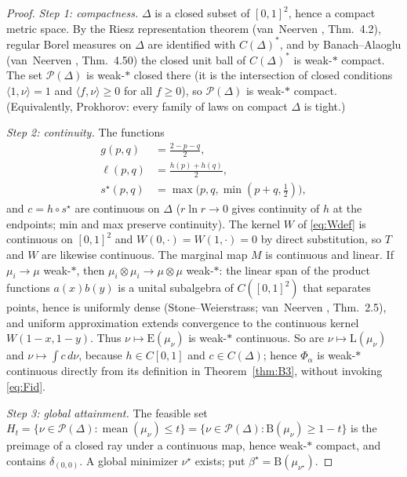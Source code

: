 \documentclass[11pt]{article}
\theoremstyle{plain}
\theoremstyle{definition}
\theoremstyle{remark}
\DeclareMathOperator{\mean}{mean}
\newcommand{\PP}{\mathcal P}
\newcommand{\DD}{\Delta}
\newcommand{\sstar}{s^{\star}}
\newcommand{\Lb}{\mathrm{L}}
\newcommand{\Bb}{\mathrm{B}}
\newcommand{\Ee}{\mathrm{E}}
\begin{document}
\begin{proof}
\emph{Step 1: compactness.} $\DD$ is a closed subset of $[0,1]^2$, hence a
compact metric space. By the Riesz representation theorem (van~Neerven
\cite{vanneerven}, Thm.~4.2), regular Borel measures on $\DD$ are identified
with $C(\DD)^*$, and by Banach--Alaoglu (van~Neerven \cite{vanneerven},
Thm.~4.50) the closed unit ball of $C(\DD)^*$ is weak-$*$ compact. The set
$\PP(\DD)$ is weak-$*$ closed there (it is the intersection of closed conditions
$\langle 1,\nu\rangle=1$ and $\langle f,\nu\rangle\ge0$ for all $f\ge0$),
so $\PP(\DD)$ is weak-$*$ compact. (Equivalently, Prokhorov: every family of
laws on compact $\DD$ is tight.)

\emph{Step 2: continuity.} The functions
\begin{align*}
g(p,q)&=\frac{2-p-q}{2},\\
\ell(p,q)&=\frac{h(p)+h(q)}{2},\\
\sstar(p,q)&=\max\bigl(p,q,\min(p+q,\tfrac12)\bigr),
\end{align*}
and $c=h\circ\sstar$
are continuous on $\DD$ ($r\ln r\to0$ gives continuity of $h$ at the
endpoints; min and max preserve continuity). The kernel $W$ of \eqref{eq:Wdef}
is continuous on $[0,1]^2$ and $W(0,\cdot)=W(1,\cdot)=0$ by direct
substitution, so $T$ and $W$ are likewise continuous. The marginal map $M$ is
continuous and linear. If $\mu_i\to\mu$ weak-$*$, then $\mu_i\otimes\mu_i\to
\mu\otimes\mu$ weak-$*$: the linear span of the product functions
$a(x)b(y)$ is a unital subalgebra of $C([0,1]^2)$ that separates points, hence
is uniformly dense
(Stone--Weierstrass; van~Neerven \cite{vanneerven}, Thm.~2.5), and
uniform approximation extends convergence to the continuous kernel $W(1-x,1-y)$.
Thus $\nu\mapsto\Ee(\mu_\nu)$ is weak-$*$ continuous.  So are
$\nu\mapsto\Lb(\mu_\nu)$ and $\nu\mapsto\int c\,d\nu$, because $h\in C[0,1]$
and $c\in C(\DD)$; hence $\Phi_\alpha$ is weak-$*$ continuous directly from its
definition in Theorem~\ref{thm:B3}, without invoking \eqref{eq:Fid}.

\emph{Step 3: global attainment.}
The feasible set
$H_t=\{\nu\in\PP(\DD):\mean(\mu_\nu)\le t\}
=\{\nu\in\PP(\DD):\Bb(\mu_\nu)\ge1-t\}$ is the preimage of a closed ray
under a continuous map, hence weak-$*$ compact, and contains
$\delta_{(0,0)}$.  A global minimizer $\nu^{\star}$ exists; put
$\beta^{\star}=\Bb(\mu_{\nu^{\star}})$.


\end{proof}
\end{document}
